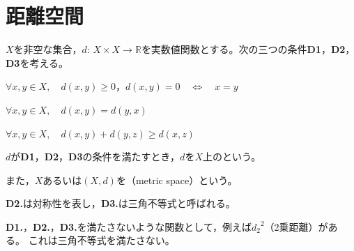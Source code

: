 \documentclass{jsarticle}
\begin{document}
\fi

\section{距離空間}

\begin{teigi}
    $X$を非空な集合，$d: \, X \times X \to \mathbb{R}$を実数値関数とする。次の三つの条件{\bf D1}，{\bf D2}，{\bf D3}を考える。
    
     $\forall x, y \in X, \quad d(x,y) \ge 0$，\qquad $d(x,y) = 0 \quad \Longleftrightarrow \quad x = y$
    
     $\forall x, y \in X, \quad d(x,y) = d(y,x)$
    
     $\forall x, y \in X, \quad d(x,y) + d(y,z) \ge d(x,z)$
    
    $d$が{\bf D1}，{\bf D2}，{\bf D3}の条件を満たすとき，$d$を$X$上のという。

    また，$X$あるいは$(X,d)$を（metric space）という。
\end{teigi}

{\bf D2.}は対称性を表し，{\bf D3.}は三角不等式と呼ばれる。

{\bf D1.}，{\bf D2.}，{\bf D3.}を満たさないような関数として，例えば${d_{2}}^{2}$（2乗距離）がある。
これは三角不等式を満たさない。
\end{document}
